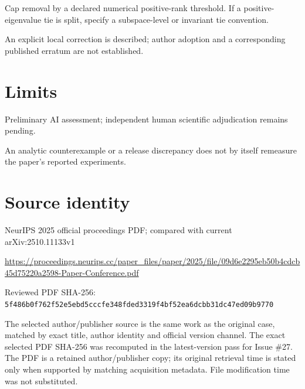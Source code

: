 \documentclass[11pt]{article}
\begin{document}
Cap removal by a declared numerical positive-rank threshold. If a positive-eigenvalue tie is split, specify a subspace-level or invariant tie convention.

An explicit local correction is described; author adoption and a corresponding published erratum are not established.

\section*{Limits}

Preliminary AI assessment; independent human scientific adjudication remains pending.\par

An analytic counterexample or a release discrepancy does not by itself remeasure the paper’s reported experiments.\par

\section*{Source identity}

NeurIPS 2025 official proceedings PDF; compared with current arXiv:2510.11133v1

\url{https://proceedings.neurips.cc/paper_files/paper/2025/file/09d6e2295eb50b4cdcb45d75220a2598-Paper-Conference.pdf}

Reviewed PDF SHA-256: \nolinkurl{5f486b0f762f52e5ebd5cccfe348fded3319f4bf52ea6dcbb31dc47ed09b9770}

The selected author/publisher source is the same work as the original case, matched by exact title, author identity and official version channel. The exact selected PDF SHA-256 was recomputed in the latest-version pass for Issue \#27. The PDF is a retained author/publisher copy; its original retrieval time is stated only when supported by matching acquisition metadata. File modification time was not substituted.
\end{document}
